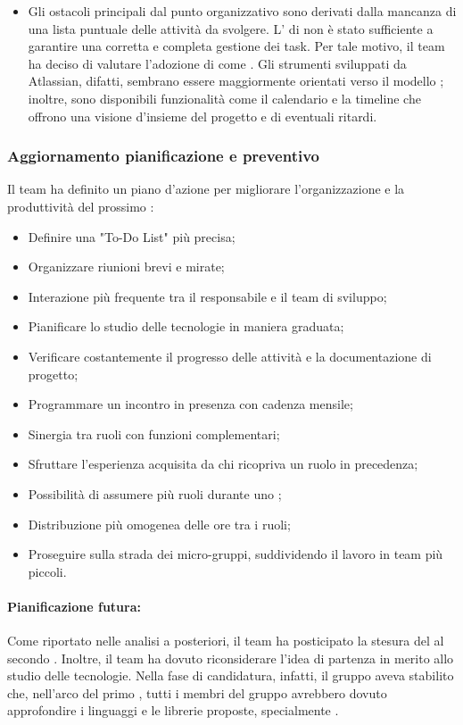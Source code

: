 \begin{itemize}
  \item Gli ostacoli principali dal punto organizzativo sono derivati dalla mancanza di una lista puntuale delle attività da svolgere. L' di  non è stato sufficiente a garantire una corretta e completa gestione dei task. Per tale motivo, il team ha deciso di valutare l'adozione di  come . Gli strumenti sviluppati da Atlassian, difatti, sembrano essere maggiormente orientati verso il modello ; inoltre, sono disponibili funzionalità come il calendario e la timeline che offrono una visione d'insieme del progetto e di eventuali ritardi.
\end{itemize}

\subsubsection{Aggiornamento pianificazione e preventivo}
\par Il team ha definito un piano d'azione per migliorare l'organizzazione e la produttività del prossimo :
\begin{itemize}
  \item Definire una "To-Do List" più precisa;
  \item Organizzare riunioni brevi e mirate;
  \item Interazione più frequente tra il responsabile e il team di sviluppo;
  \item Pianificare lo studio delle tecnologie in maniera graduata;
  \item Verificare costantemente il progresso delle attività e la documentazione di progetto;
  \item Programmare un incontro in presenza con cadenza mensile;
  \item Sinergia tra ruoli con funzioni complementari;
  \item Sfruttare l'esperienza acquisita da chi ricopriva un ruolo in precedenza;
  \item Possibilità di assumere più ruoli durante uno ;
  \item Distribuzione più omogenea delle ore tra i ruoli;
  \item Proseguire sulla strada dei micro-gruppi, suddividendo il lavoro in team più piccoli.
\end{itemize}

\paragraph*{Pianificazione futura:}
\par Come riportato nelle analisi a posteriori, il team ha posticipato la stesura del  al secondo . Inoltre, il team ha dovuto riconsiderare l’idea di partenza in merito allo studio delle tecnologie. Nella fase di candidatura, infatti, il gruppo aveva stabilito che, nell’arco del primo , tutti i membri del gruppo avrebbero dovuto approfondire i linguaggi e le librerie proposte, specialmente .

